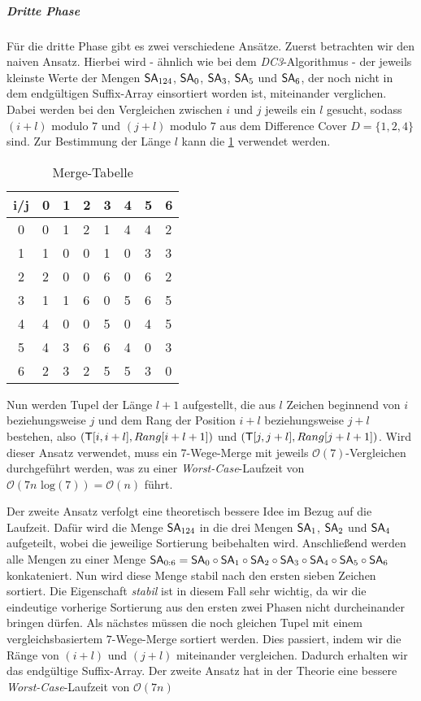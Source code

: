 \subparagraph*{Dritte Phase}

Für die dritte Phase gibt es zwei verschiedene Ansätze. Zuerst betrachten wir den naiven Ansatz. Hierbei wird - ähnlich wie bei dem \emph{DC3}-Algorithmus - der jeweils kleinste Werte der Mengen $\sa_{124}$, $\sa_0$, $\sa_3$, $\sa_5$ und  $\sa_6$, der noch nicht in dem endgültigen Suffix-Array einsortiert worden ist, miteinander verglichen. Dabei werden bei den Vergleichen zwischen $i$ und $j$ jeweils ein $l$ gesucht, sodass $(i + l) \text{ modulo } 7$ und $(j + l) \text{ modulo } 7$ aus dem Difference Cover $D = \{1, 2, 4\}$ sind. Zur Bestimmung der Länge $l$ kann die \cref{tab:merge} verwendet werden.

\begin{table}[H]
	\centering
	\begin{tabular}{c|lllllll}
		i/j & 0 & 1 & 2 & 3 & 4 & 5 & 6 \\\hline
		0   & 0 & 1 & 2 & 1 & 4 & 4 & 2 \\
		1   & 1 & 0 & 0 & 1 & 0 & 3 & 3 \\
		2   & 2 & 0 & 0 & 6 & 0 & 6 & 2 \\
		3   & 1 & 1 & 6 & 0 & 5 & 6 & 5 \\
		4   & 4 & 0 & 0 & 5 & 0 & 4 & 5 \\
		5   & 4 & 3 & 6 & 6 & 4 & 0 & 3 \\
		6   & 2 & 3 & 2 & 5 & 5 & 3 & 0
	\end{tabular}
	\caption{Merge-Tabelle}
	\label{tab:merge}
\end{table}

Nun werden Tupel der Länge $l+1$ aufgestellt, die aus $l$ Zeichen beginnend von $i$ beziehungsweise $j$ und dem Rang der Position $i+l$ beziehungsweise $j+l$ bestehen, also $(\inputtext[i, i+l], Rang[i+l+1])$ und $(\inputtext[j, j+l], Rang[j+l+1])$. Wird dieser Ansatz verwendet, muss ein 7-Wege-Merge mit jeweils $\mathcal{O}(7)$-Vergleichen durchgeführt werden, was zu einer \emph{Worst-Case}-Laufzeit von $\mathcal{O}(7n \text{ log} (7)) = \mathcal{O}(n) $ führt.

Der zweite Ansatz verfolgt eine theoretisch bessere Idee im Bezug auf die Laufzeit. Dafür wird die Menge $\sa_{124}$ in die drei Mengen $\sa_1$, $\sa_2$ und $\sa_4$ aufgeteilt, wobei die jeweilige Sortierung beibehalten wird. Anschließend werden alle Mengen zu einer Menge $\sa_{0:6} = \sa_0 \circ \sa_1 \circ \sa_2 \circ \sa_3 \circ \sa_4 \circ \sa_5 \circ \sa_6$ konkateniert. Nun wird diese Menge stabil nach den ersten sieben Zeichen sortiert. Die Eigenschaft \emph{stabil} ist in diesem Fall sehr wichtig, da wir die eindeutige vorherige Sortierung aus den ersten zwei Phasen nicht durcheinander bringen dürfen. Als nächstes müssen die noch gleichen Tupel mit einem vergleichsbasiertem $7$-Wege-Merge sortiert werden. Dies passiert, indem wir die Ränge von $(i+l)$ und $(j+l)$ miteinander vergleichen. Dadurch erhalten wir das endgültige Suffix-Array. Der zweite Ansatz hat in der Theorie eine bessere \emph{Worst-Case}-Laufzeit von $\mathcal{O}(7n)$

